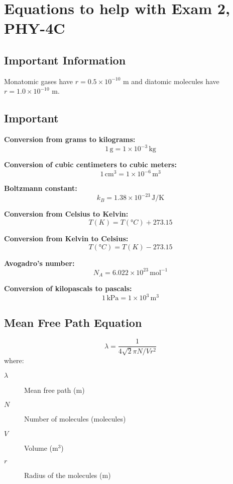 \documentclass{article}
\begin{document}
\section*{Equations to help with Exam 2, PHY-4C}
\subsection*{Important Information}
Monatomic gases have \( r = 0.5 \times 10^{-10} \) m and diatomic molecules have \( r = 1.0 \times 10^{-10} \) m.

\subsection*{Important}

\textbf{Conversion from grams to kilograms:}
\begin{equation}
1 \, \text{g} = 1 \times 10^{-3} \, \text{kg}
\end{equation}

\textbf{Conversion of cubic centimeters to cubic meters:}
\begin{equation}
1 \, \text{cm}^3 = 1 \times 10^{-6} \, \text{m}^3
\end{equation}

\textbf{Boltzmann constant:}
\begin{equation}
k_B = 1.38 \times 10^{-23} \, \text{J/K}
\end{equation}

\textbf{Conversion from Celsius to Kelvin:}
\begin{equation}
T(K) = T(°C) + 273.15
\end{equation}

\textbf{Conversion from Kelvin to Celsius:}
\begin{equation}
T(°C) = T(K) - 273.15
\end{equation}

\textbf{Avogadro's number:}
\begin{equation}
N_A = 6.022 \times 10^{23} \, \text{mol}^{-1}
\end{equation}

\textbf{Conversion of kilopascals to pascals:}
\begin{equation}
1 \, \text{kPa} = 1 \times 10^3 \, \text{m}^3
\end{equation}

\subsection*{Mean Free Path Equation}
\begin{equation}
\lambda = \frac{1}{4\sqrt{2} \pi {N}/{V} r^2}
\end{equation}
where:
\begin{description}
    \item[$\lambda$] Mean free path (m)
    \item[$N$] Number of molecules (molecules)
    \item[$V$] Volume (m\(^3\))
    \item[$r$] Radius of the molecules (m)
\end{description}
\end{document}
